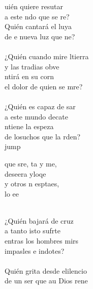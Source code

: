 \begin{cancion}%
	uién quiere resutar \\
	a este ndo que se re?\\
	Quién cantará el luya\\
	de e nueva luz que ne?\\
	\jump\\
	¿Quién cuando mire ltierra \\
	y las tradias obve\\
	ntirá en su corn  \\
	el dolor de quien se mre?\\
	\jump\\
	¿Quién es capaz de sar \\
	a este mundo decate\\
	ntiene la espeza \\
	de losuchos que la rden?\\jump\\
	\begin{chorus}%
	que sre, ta y me, \\
	deseera yloqe\\
	y otros n esptaes, \\
	lo ee\\
	\end{chorus}%
	\jump\\
	¿Quién bajará de  cruz \\
	a tanto isto sufrte\\
	entras los hombres mirs \\
	impasles e indotes?\\
	\jump\\
	Quién grita desde elilencio \\
	de un ser que au Dios rene\\

\end{cancion}

